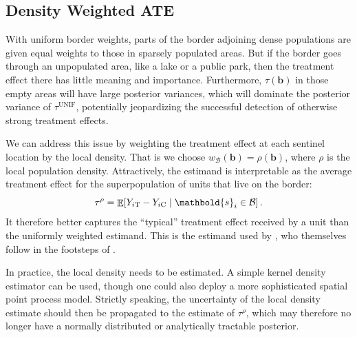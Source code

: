 \documentclass[letter,12pt]{article}
\DeclarePairedDelimiter{\squarebracket}{\lbrack}{\rbrack}
\newcommand{\sbr}[1]{\squarebracket*{#1}}
\DeclareMathOperator{\E}{\mathbb{E}}
\newcommand{\treat}{\mathrm{T}}
\newcommand{\ctrol}{\mathrm{C}}
\newcommand{\svec}{\mathbold{s}}
\newcommand{\border}{\mathcal{B}}
\newcommand{\sentinel}{\bm{b}}
\newcommand{\unifavg}{\tau^{\mathrm{UNIF}}}
\newcommand{\taurho}{\tau^{\rho}}
\newcommand{\weightb}{w_{\border}}
\begin{document}
\hypertarget{density-weighted-ate}{%
\subsection{Density Weighted ATE}\label{density-weighted-ate}}

\label{sec:tau_rho}



With uniform border weights, parts of the border adjoining dense populations are given equal weights to those in sparsely populated areas.
But if the border goes through an unpopulated area, like a lake or a public park, then the treatment effect there has little meaning and importance.
Furthermore, \(\tau(\sentinel)\) in those empty areas will have large posterior variances, which will dominate the posterior variance of \(\unifavg\), potentially jeopardizing the successful detection of otherwise strong treatment effects.

We can address this issue by weighting the treatment effect at each sentinel location by the local density.
That is we choose \(\weightb(\sentinel) = \rho(\sentinel)\), where \(\rho\) is the local population density.
Attractively, the estimand is interpretable as the average treatment effect for the superpopulation of units that live on the border:
\begin{equation}
    \taurho = \E\sbr{Y_{i\treat} - Y_{i\ctrol} \mid \svec_i \in \border}\,.
\end{equation}
It therefore better captures the ``typical'' treatment effect received by a unit than the uniformly weighted estimand.
This is the estimand used by \cite{keele_titiunik_2015}, who themselves follow in the footsteps of \cite{imbens2011regression}.

In practice, the local density needs to be estimated.
A simple kernel density estimator can be used,
though one could also deploy a more sophisticated spatial point process model.
Strictly speaking, the uncertainty of the local density estimate should then be propagated to the estimate of \(\taurho\), which may therefore no longer have a normally distributed or analytically tractable posterior.
\end{document}
